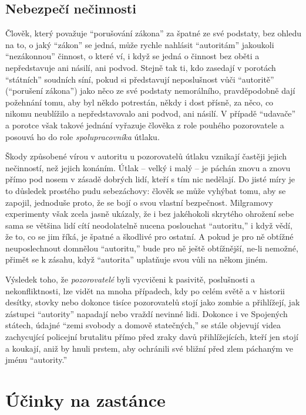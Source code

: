 \documentclass{book}
\begin{document}
\section{Nebezpečí nečinnosti}

Člověk, který považuje \enquote{porušování zákona} za špatné ze své podstaty, bez ohledu na to, o jaký \enquote{zákon} se jedná, může rychle nahlásit \enquote{autoritám} jakoukoli \enquote{nezákonnou} činnost, o které ví, i když se jedná o činnost bez oběti a nepředstavuje ani násilí, ani podvod. Stejně tak ti, kdo zasedají v porotách \enquote{státních} soudních síní, pokud si představují neposlušnost vůči \enquote{autoritě} (\enquote{porušení zákona}) jako něco ze své podstaty nemorálního, pravděpodobně dají požehnání tomu, aby byl někdo potrestán, někdy i dost přísně, za něco, co nikomu neublížilo a nepředstavovalo ani podvod, ani násilí. V případě \enquote{udavače} a porotce však takové jednání vyřazuje člověka z role pouhého pozorovatele a posouvá ho do role \emph{spolupracovníka} útlaku.

Škody způsobené vírou v autoritu u pozorovatelů útlaku vznikají častěji jejich nečinností, než jejich konáním. Útlak -- velký i malý -- je páchán znovu a znovu přímo pod nosem v zásadě dobrých lidí, kteří s tím nic nedělají. Do jisté míry je to důsledek prostého pudu sebezáchovy: člověk se může vyhýbat tomu, aby se zapojil, jednoduše proto, že se bojí o svou vlastní bezpečnost. Milgramovy experimenty však zcela jasně ukázaly, že i bez jakéhokoli skrytého ohrožení sebe sama se většina lidí cítí neodolatelně nucena poslouchat \enquote{autoritu,} i když vědí, že to, co se jim říká, je špatné a škodlivé pro ostatní. A pokud je pro ně obtížné neuposlechnout domnělou \enquote{autoritu,} bude pro ně ještě obtížnější, ne-li nemožné, přimět se k zásahu, když \enquote{autorita} uplatňuje svou vůli na někom jiném.

Výsledek toho, že \emph{pozorovatelé} byli vycvičeni k pasivitě, poslušnosti a nekonfliktnosti, lze vidět na mnoha případech, kdy po celém světě a v historii desítky, stovky nebo dokonce tisíce pozorovatelů stojí jako zombie a přihlížejí, jak zástupci \enquote{autority} napadají nebo vraždí nevinné lidi. Dokonce i ve Spojených státech, údajné \enquote{zemi svobody a domově statečných,} se stále objevují videa zachycující policejní brutalitu přímo před zraky davů přihlížejících, kteří jen stojí a koukají, aniž by hnuli prstem, aby ochránili své bližní před zlem páchaným ve jménu \enquote{autority.}

\chapter{Účinky na zastánce}
\end{document}
